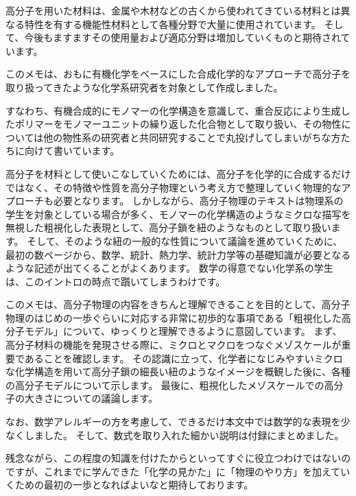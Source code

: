 \documentclass[a4paper,11pt]{jlreq}
\begin{document}
高分子を用いた材料は、金属や木材などの古くから使われてきている材料とは異なる特性を有する機能性材料として各種分野で大量に使用されています。
そして、今後もますますその使用量および適応分野は増加していくものと期待されています。

このメモは、おもに有機化学をベースにした合成化学的なアプローチで高分子を取り扱ってきたような化学系研究者を対象として作成しました。

すなわち、有機合成的にモノマーの化学構造を意識して、重合反応により生成したポリマーをモノマーユニットの繰り返した化合物として取り扱い、その物性については他の物性系の研究者と共同研究することで丸投げしてしまいがちな方たちに向けて書いています。

高分子を材料として使いこなしていくためには、高分子を化学的に合成するだけではなく、その特徴や性質を高分子物理という考え方で整理していく物理的なアプローチも必要となります。
しかしながら、高分子物理のテキストは物理系の学生を対象としている場合が多く、モノマーの化学構造のようなミクロな描写を無視した粗視化した表現として、高分子鎖を紐のようなものとして取り扱います。
そして、そのような紐の一般的な性質について議論を進めていくために、最初の数ページから、数学、統計、熱力学、統計力学等の基礎知識が必要となるような記述が出てくることがよくあります。
数学の得意でない化学系の学生は、このイントロの時点で躓いてしまうわけです。

このメモは、高分子物理の内容をきちんと理解できることを目的として、高分子物理のはじめの一歩ぐらいに対応する非常に初歩的な事項である「粗視化した高分子モデル」について、ゆっくりと理解できるように意図しています。
まず、高分子材料の機能を発現させる際に、ミクロとマクロをつなぐメゾスケールが重要であることを確認します。
その認識に立って、化学者になじみやすいミクロな化学構造を用いて高分子鎖の細長い紐のようなイメージを概観した後に、各種の高分子モデルについて示します。
最後に、粗視化したメゾスケールでの高分子の大きさについての議論します。

なお、数学アレルギーの方を考慮して、できるだけ本文中では数学的な表現を少なくしました。
そして、数式を取り入れた細かい説明は付録にまとめました。

残念ながら、この程度の知識を付けたからといってすぐに役立つわけではないのですが、これまでに学んできた「化学の見かた」に「物理のやり方」を加えていくための最初の一歩となればよいなと期待しております。
\end{document}
